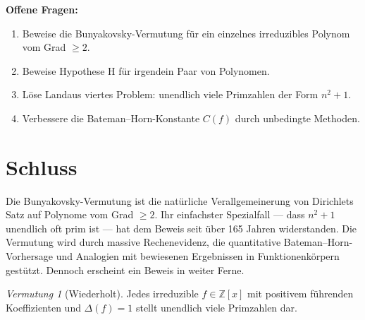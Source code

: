\documentclass[12pt,a4paper]{amsart}
\theoremstyle{definition}
\theoremstyle{remark}
\newtheorem{vermutung}[theorem]{Vermutung}
\newcommand{\Z}{\mathbb{Z}}
\begin{document}
\noindent\textbf{Offene Fragen:}
\begin{enumerate}[label=(\arabic*)]
  \item Beweise die Bunyakovsky-Vermutung für ein einzelnes irreduzibles
        Polynom vom Grad $\geq 2$.
  \item Beweise Hypothese H für irgendein Paar von Polynomen.
  \item Löse Landaus viertes Problem: unendlich viele Primzahlen der Form $n^2+1$.
  \item Verbessere die Bateman--Horn-Konstante $C(f)$ durch unbedingte Methoden.
\end{enumerate}

\section{Schluss}

Die Bunyakovsky-Vermutung ist die natürliche Verallgemeinerung von Dirichlets Satz
auf Polynome vom Grad $\geq 2$.
Ihr einfachster Spezialfall --- dass $n^2 + 1$ unendlich oft prim ist ---
hat dem Beweis seit über 165 Jahren widerstanden.
Die Vermutung wird durch massive Rechenevidenz, die quantitative
Bateman--Horn-Vorhersage und Analogien mit bewiesenen Ergebnissen in
Funktionenkörpern gestützt.
Dennoch erscheint ein Beweis in weiter Ferne.

\begin{vermutung}[Wiederholt]
Jedes irreduzible $f \in \Z[x]$ mit positivem führenden Koeffizienten
und $\Delta(f) = 1$ stellt unendlich viele Primzahlen dar.
\end{vermutung}
\end{document}
